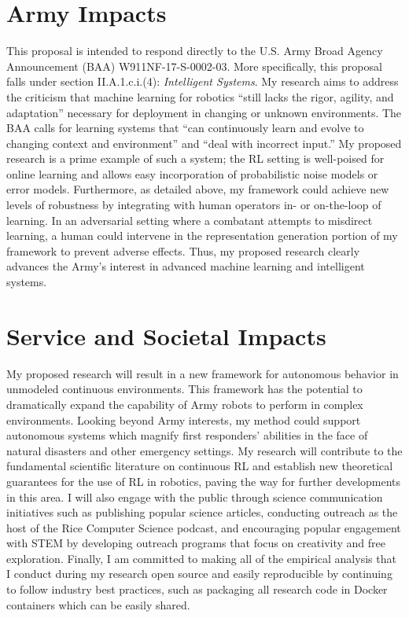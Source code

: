 \documentclass[10pt]{article}
\begin{document}
\section*{Army Impacts}
This proposal is intended to respond directly to the U.S. Army Broad Agency
Announcement (BAA) W911NF-17-S-0002-03. More specifically, this
proposal falls under section II.A.1.c.i.(4): \emph{Intelligent Systems}. My
research aims to address the criticism that machine learning for robotics
``still lacks the rigor, agility, and adaptation'' necessary for deployment
in changing or unknown environments. The BAA calls for learning systems that
``can continuously learn and evolve to changing context and environment'' and
``deal with incorrect input.'' My proposed research is a prime example of such a
system; the RL setting is well-poised for online learning and allows easy
incorporation of probabilistic noise models or error models. Furthermore, as
detailed above, my framework could achieve new levels of robustness by
integrating with human operators in- or on-the-loop of learning. In an
adversarial setting where a combatant attempts to misdirect learning, a human
could intervene in the representation generation portion of my framework to
prevent adverse effects. Thus, my proposed research clearly advances the Army's
interest in advanced machine learning and intelligent systems.

\section*{Service and Societal Impacts}
My proposed research will result in a new framework for autonomous behavior in
unmodeled continuous environments. This framework has the potential to
dramatically expand the capability of Army robots to perform in complex
environments. Looking beyond Army interests, my method
could support autonomous systems which magnify first responders' abilities in
the face of natural disasters and other emergency settings. My research will
contribute to the fundamental scientific literature on continuous RL and
establish new theoretical guarantees for the use of RL in robotics, paving the
way for further developments in this area. I will also engage with the public
through science communication initiatives such as publishing popular science
articles, conducting outreach as the host of the Rice Computer Science podcast,
and encouraging popular engagement with STEM by developing outreach programs
that focus on creativity and free exploration. Finally, I am committed to making
all of the empirical analysis that I conduct during my research open source and
easily reproducible by continuing to follow industry best practices, such as
packaging all research code in Docker containers which can be easily shared.
\end{document}
